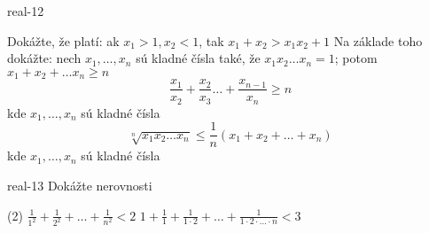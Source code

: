 \begin{defproblem}{real-12}
\begin{tasks}
  \task Dokážte, že platí: ak $x_1 > 1, x_2 < 1$, tak $x_1 + x_2 > x_1 x_2 + 1$
  \task Na základe toho dokážte: nech $x_1, \ldots, x_n$ sú kladné čísla také,
        že $x_1 x_2 \ldots x_n = 1$; potom $x_1 + x_2 + \ldots x_n \geq n$
  \task
    \[
      \frac{x_1}{x_2} + \frac{x_2}{x_3} \ldots + \frac{x_{n-1}}{x_n} \geq n
    \]
    kde $x_1, \ldots, x_n$ sú kladné čísla
  \task
    \[
      \sqrt[n]{x_1 x_2 \ldots x_n} \leq \frac{1}{n}(x_1 + x_2 + \ldots + x_n)
    \]
    kde $x_1, \ldots, x_n$ sú kladné čísla
\end{tasks}
\end{defproblem}

\begin{defproblem}{real-13}
Dokážte nerovnosti
\begin{tasks}(2)
  \task $\frac{1}{1^2} + \frac{1}{2^2} + \ldots + \frac{1}{n^2} < 2$
  \task $1 + \frac{1}{1} + \frac{1}{1 \cdot 2} + \ldots +
         \frac{1}{1 \cdot 2 \cdot \ldots \cdot n} < 3$
\end{tasks}
\end{defproblem}
